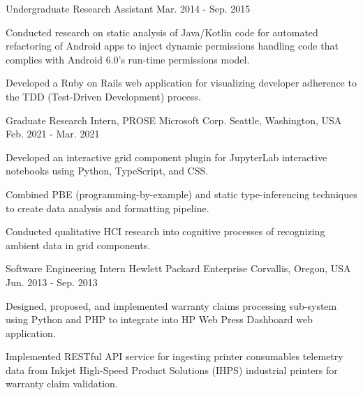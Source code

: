\begin{cventries}
  \cventry
    {Undergraduate Research Assistant} %
    {} %
    {} %
    {Mar. 2014 - Sep. 2015} %
    {
      \begin{cvitems} %
        \item {Conducted research on static analysis of Java/Kotlin code for automated refactoring of Android apps to inject dynamic permissions handling code that complies with Android 6.0's run-time permissions model.}
    	\item {Developed a Ruby on Rails web application for visualizing developer adherence to the TDD (Test-Driven Development) process.}
      \end{cvitems}
    }

  \cventry
    {Graduate Research Intern, PROSE} %
    {Microsoft Corp.} %
    {Seattle, Washington, USA} %
    {Feb. 2021 - Mar. 2021} %
    {
   	  \begin{cvitems} %
        \item {Developed an interactive grid component plugin for JupyterLab interactive notebooks using Python, TypeScript, and CSS.}
        \item {Combined PBE (programming-by-example) and static type-inferencing techniques to create data analysis and formatting pipeline.}
        \item {Conducted qualitative HCI research into cognitive processes of recognizing ambient data in grid components.}
      \end{cvitems}
    }
    
  \cventry
    {Software Engineering Intern} %
    {Hewlett Packard Enterprise} %
    {Corvallis, Oregon, USA} %
    {Jun. 2013 - Sep. 2013} %
    {
      \begin{cvitems} %
        \item {Designed, proposed, and implemented warranty claims processing sub-system using Python and PHP to integrate into HP Web Press Dashboard web application.}
        \item {Implemented RESTful API service for ingesting printer consumables telemetry data from Inkjet High-Speed Product Solutions (IHPS) industrial printers for warranty claim validation.}
      \end{cvitems}
    }


\end{cventries}
